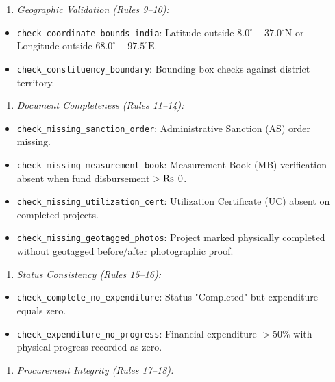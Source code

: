 \documentclass[11pt,a4paper]{article}
\begin{document}
\begin{enumerate}[leftmargin=1.5em, itemsep=2pt, topsep=3pt]
\item \textit{Geographic Validation (Rules 9–10):}
\end{enumerate}
\begin{itemize}[leftmargin=1.5em, itemsep=2pt, topsep=3pt]
\item \texttt{check\_coordinate\_bounds\_india}: Latitude outside $8.0^\circ - 37.0^\circ\text{N}$ or Longitude outside $68.0^\circ - 97.5^\circ\text{E}$.
\item \texttt{check\_constituency\_boundary}: Bounding box checks against district territory.
\end{itemize}
\begin{enumerate}[leftmargin=1.5em, itemsep=2pt, topsep=3pt]
\item \textit{Document Completeness (Rules 11–14):}
\end{enumerate}
\begin{itemize}[leftmargin=1.5em, itemsep=2pt, topsep=3pt]
\item \texttt{check\_missing\_sanction\_order}: Administrative Sanction (AS) order missing.
\item \texttt{check\_missing\_measurement\_book}: Measurement Book (MB) verification absent when fund disbursement $> \text{Rs.\,}0$.
\item \texttt{check\_missing\_utilization\_cert}: Utilization Certificate (UC) absent on completed projects.
\item \texttt{check\_missing\_geotagged\_photos}: Project marked physically completed without geotagged before/after photographic proof.
\end{itemize}
\begin{enumerate}[leftmargin=1.5em, itemsep=2pt, topsep=3pt]
\item \textit{Status Consistency (Rules 15–16):}
\end{enumerate}
\begin{itemize}[leftmargin=1.5em, itemsep=2pt, topsep=3pt]
\item \texttt{check\_complete\_no\_expenditure}: Status "Completed" but expenditure equals zero.
\item \texttt{check\_expenditure\_no\_progress}: Financial expenditure $> 50\%$ with physical progress recorded as zero.
\end{itemize}
\begin{enumerate}[leftmargin=1.5em, itemsep=2pt, topsep=3pt]
\item \textit{Procurement Integrity (Rules 17–18):}
\end{enumerate}
\end{document}
